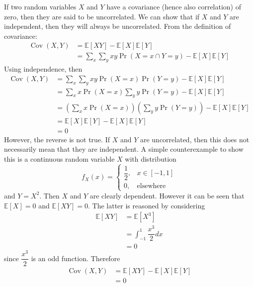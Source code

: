 \documentclass[11pt]{report} %
\begin{document}
If two random variables $X$ and $Y$ have a covariance (hence also correlation) of zero, then they are said to be uncorrelated. We can show that if $X$ and $Y$ are independent, then they will always be uncorrelated. From the definition of covariance:
\begin{align}
\operatorname{Cov}\left(X, Y\right) &= \mathbb{E}\left[XY\right] - \mathbb{E}\left[X\right]\mathbb{E}\left[Y\right] \\
&= \sum_{x}\sum_{y}xy\operatorname{Pr}\left(X = x \cap Y = y\right) - \mathbb{E}\left[X\right]\mathbb{E}\left[Y\right]
\end{align}
Using independence, then
\begin{align}
\operatorname{Cov}\left(X, Y\right) &= \sum_{x}\sum_{y}xy\operatorname{Pr}\left(X = x\right)\operatorname{Pr}\left(Y = y\right) - \mathbb{E}\left[X\right]\mathbb{E}\left[Y\right] \\
&= \sum_{x}x\operatorname{Pr}\left(X = x\right)\sum_{y}y\operatorname{Pr}\left(Y = y\right) - \mathbb{E}\left[X\right]\mathbb{E}\left[Y\right] \\
&= \left(\sum_{x}x\operatorname{Pr}\left(X = x\right)\right)\left(\sum_{y}y\operatorname{Pr}\left(Y = y\right)\right) - \mathbb{E}\left[X\right]\mathbb{E}\left[Y\right] \\
&= \mathbb{E}\left[X\right]\mathbb{E}\left[Y\right] - \mathbb{E}\left[X\right]\mathbb{E}\left[Y\right] \\
&= 0
\end{align}
However, the reverse is not true. If $X$ and $Y$ are uncorrelated, then this does not necessarily mean that they are independent. A simple counterexample to show this is a continuous random variable $X$ with distribution
\begin{equation}
f_{X}\left(x\right) = \begin{cases} \dfrac{1}{2}, & x\in\left[-1, 1\right] \\ 0, & \mathrm{elsewhere}\end{cases}
\end{equation}
and $Y = X^{2}$. Then $X$ and $Y$ are clearly dependent. However it can be seen that $\mathbb{E}\left[X\right] = 0$ and $\mathbb{E}\left[XY\right] = 0$. The latter is reasoned by considering
\begin{align}
\mathbb{E}\left[XY\right] &= \mathbb{E}\left[X^{3}\right] \\
&= \int_{-1}^{1}\dfrac{x^{3}}{2}dx \\
&= 0
\end{align}
since $\dfrac{x^{3}}{2}$ is an odd function. Therefore
\begin{align}
\operatorname{Cov}\left(X, Y\right) &= \mathbb{E}\left[XY\right] - \mathbb{E}\left[X\right]\mathbb{E}\left[Y\right] \\
&= 0
\end{align}
\end{document}
